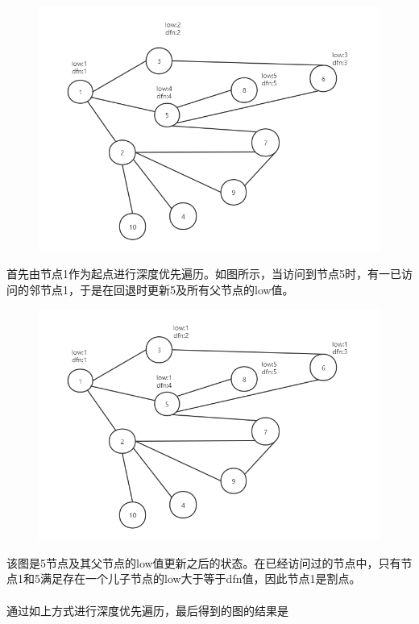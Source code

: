 \documentclass[UTF8,a4paperdui, %
]{ctexart}
\begin{document}
\begin{figure}[ht]
\centering
\includegraphics[scale=0.45]{picture1.png}
\end{figure}
首先由节点1作为起点进行深度优先遍历。如图所示，当访问到节点5时，有一已访问的邻节点1，于是在回退时更新5及所有父节点的low值。

\begin{figure}[ht]
\centering
\includegraphics[scale=0.45]{picture2.png}
\end{figure}

该图是5节点及其父节点的low值更新之后的状态。在已经访问过的节点中，只有节点1和5满足存在一个儿子节点的low大于等于dfn值，因此节点1是割点。\\
\\

通过如上方式进行深度优先遍历，最后得到的图的结果是
\end{document}
